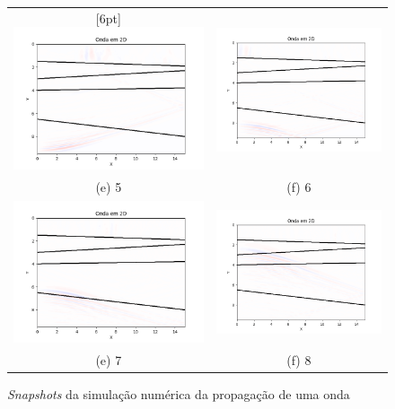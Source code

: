 \begin{figure}[H]
\begin{tabular}{cc}
                    [6pt] \includegraphics[width=65mm]{imagens/FDMimages/Teste015.png} & \includegraphics[width=65mm]{imagens/FDMimages/Teste019.png} \\ 
                    (e) 5 & (f) 6\\
                    [6pt] \includegraphics[width=65mm]{imagens/FDMimages/Teste023.png} &  \includegraphics[width=65mm]{imagens/FDMimages/Teste030.png}\\
                    (e) 7 & (f) 8
                    \end{tabular}
                    \caption{\textit{Snapshots} da simulação numérica da propagação de uma onda}
                    \label{fig:snapsMDF}
                \end{figure}

